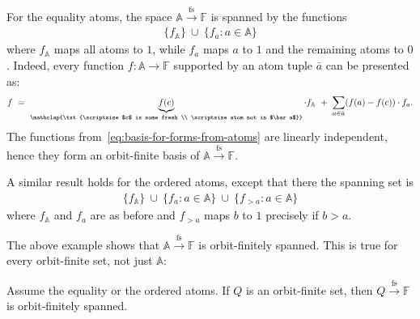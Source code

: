 \documentclass[10pt,a4paper]{amsart}
\numberwithin{equation}{section}
\newcommand{\set}[1]{\{#1\}}
\newcommand{\myunderbrace}[2]{\underbrace{#1}_{\mathclap{\txt{\scriptsize #2}}}}
\newcommand{\atoms}{\mathbb A}
\newcommand{\field}{\mathbb F}
\newcommand{\finsup}{\stackrel{\mathrm{fs}}{\to}}
\newcommand{\forms}[1]{#1 \finsup \field}
\begin{document}
\begin{example}\label{ex:forms-atoms}
    For the equality atoms,
    the space $\forms \atoms$ is spanned by the functions 
    \begin{align}\label{eq:basis-for-forms-from-atoms}
    \set{f_\atoms} \ \cup \ \set{f_a : a \in \atoms}
    \end{align}
    where $f_\atoms$ maps all atoms to $1$, while $f_a$ maps $a$ to $1$ and the remaining atoms to $0$.
    Indeed, every function $f : \atoms \to \field$ supported by an atom tuple $\bar a$ can be presented as: 
    \begin{align*}
    f \ = \ \myunderbrace{f(c)}{$c$ is some fresh \\ \scriptsize atom not in $\bar a$} \cdot f_\atoms \ + \ \sum_{a \in \bar a} (f(a) - f(c)) \cdot f_a.
    \end{align*}
   The functions from~\eqref{eq:basis-for-forms-from-atoms}  are linearly independent, hence they form an orbit-finite basis of $\forms \atoms$.
    
A similar result holds for the ordered atoms, except that there the spanning set is
  \begin{align*}\label{eq:basis-for-forms-from-atoms-ordered}
    \set{f_\atoms} \ \cup \ \set{f_a : a \in \atoms} \ \cup \ \set{f_{> a} : a \in \atoms}
    \end{align*}
    where $f_\atoms$ and $f_a$ are as before and $f_{>a}$ maps $b$ to $1$ precisely if $b > a$.
\end{example}

The above example shows that $\forms \atoms$ is  orbit-finitely spanned. This is true for every orbit-finite set, not just $\atoms$:
 

\begin{theorem}\label{thm:forms-orbit-finite} Assume the equality or the ordered atoms. If $Q$ is an orbit-finite set, then  $\forms Q$ is   orbit-finitely spanned.
\end{theorem}
\end{document}

